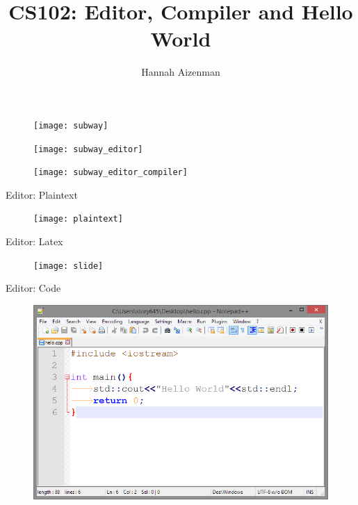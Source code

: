 \documentclass[xcolor={dvipsnames}]{beamer}
\newenvironment{changemargin}[2]{%
\begin{list}{}{%
\setlength{\topsep}{0pt}%
\setlength{\leftmargin}{#1}%
\setlength{\rightmargin}{#2}%
\setlength{\listparindent}{\parindent}%
\setlength{\itemindent}{\parindent}%
\setlength{\parsep}{\parskip}%
}%
\item[]}{\end{list}}
\begin{document}
\title{ CS102: Editor, Compiler and Hello World}
\author{Hannah Aizenman}


\begin{frame}
	\titlepage
\end{frame}

\begin{frame}[plain]	
	\begin{changemargin}{-1cm}{+0cm}
		\begin{figure}
			\texttt{[image: subway]}
		\end{figure}
	\end{changemargin}
\end{frame}

\begin{frame}[plain]	
	\begin{changemargin}{-1cm}{+0cm}
		\begin{figure}
			\texttt{[image: subway\_editor]}
		\end{figure}
	\end{changemargin}
\end{frame}

\begin{frame}[plain]	
	\begin{changemargin}{-1cm}{+0cm}
		\begin{figure}
			\texttt{[image: subway\_editor\_compiler]}
		\end{figure}
	\end{changemargin}
\end{frame}

\begin{frame}{Editor: Plaintext}
	\begin{figure}
			\texttt{[image: plaintext]}
	\end{figure}
\end{frame}

\begin{frame}{Editor: Latex}
	\begin{figure}
			\texttt{[image: slide]}
	\end{figure}
\end{frame}

\begin{frame}{Editor: Code}
	\begin{figure}
			\includegraphics[width=1\textwidth]{code}
	\end{figure}
\end{frame}
\end{document}
